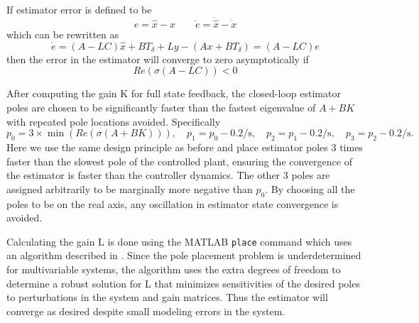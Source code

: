 \documentclass[letterpaper,11pt]{article}
\begin{document}
If estimator error is defined to be
\begin{equation*}
e = \hat{x} - x
\qquad
\dot{e} = \dot{\hat{x}} - \dot{x}
\end{equation*}
which can be rewritten as
\begin{equation*}
\dot{e} = \left(A - LC\right) \hat{x} + B T_\delta + L y - \left(A x + B T_\delta\right)
= \left(A - LC\right) e
\end{equation*}
then the error in the estimator will converge to zero asymptotically if
\begin{equation*}
Re\left(\sigma\left(A - LC\right)\right) < 0
\end{equation*}

After computing the gain K for full state feedback, the closed-loop estimator poles are 
chosen to be significantly faster than the fastest eigenvalue of $A+BK$ with 
repeated pole locations avoided. Specifically
\begin{equation*}
p_0 = 3 \times \min\left(Re\left(\sigma\left(A + BK\right)\right)\right),
\quad
p_1 = p_0 - 0.2 \si{\per\s},
\quad
p_2 = p_1 - 0.2 \si{\per\s},
\quad
p_3 = p_2 - 0.2 \si{\per\s}.
\end{equation*}
Here we use the same design principle as before and place estimator poles 3
times faster than the slowest pole of the controlled plant, ensuring the
convergence of the estimator is faster than the controller dynamics. The other
3 poles are assigned arbitrarily to be marginally more negative than $p_0$.  By choosing all the
poles to be on the real axis, any oscillation in estimator state convergence is
avoided.

Calculating the gain L is done using the MATLAB \verb|place| command which uses an 
algorithm described in \cite{Kautsky1985}. Since the pole
placement problem is underdetermined for multivariable systems, the algorithm
uses the extra degrees of freedom to determine a robust solution for L that
minimizes sensitivities of the desired poles to perturbations in the system and
gain matrices. Thus the estimator will converge as desired despite small
modeling errors in the system.
\end{document}
